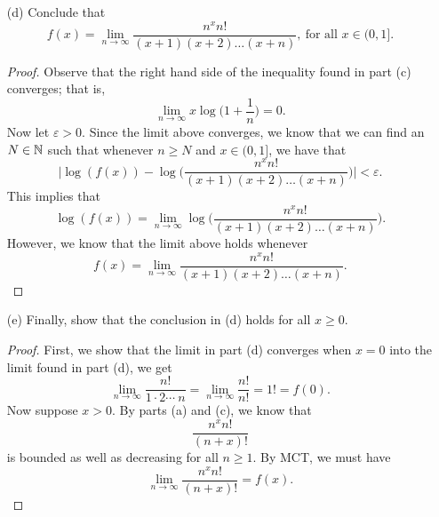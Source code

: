 \begin{enumerate}
\begin{proof}
\begin{align*}
            \end{align*}
            Hence, we have reached our desired result that
            \[  0 \leq \log(f(x)) - \log \Big( \frac{ n^{x} n!  }{ (x+1)(x+2) \dotsb (x+n)  }  \Big) \leq x \log \Big( 1 + \frac{ 1 }{ n }  \Big). \]
            \end{proof}
        \item[(d)] Conclude that 
            \[  f(x) = \lim_{ n \to \infty  }  \frac{ n^{x} n!  }{ (x+1)(x+2) \dots (x+n)  }, \ \text{for all } x \in (0,1]. \]
            \begin{proof}
                Observe that the right hand side of the inequality found in part (c) converges; that is, 
                \[  \lim_{ n \to \infty  }  x \log \Big( 1 + \frac{ 1 }{ n }  \Big) = 0.\] Now let \( \varepsilon > 0  \). Since the limit above converges, we know that we can find an \( N \in \mathbb{N}  \) such that whenever \( n \geq N  \) and \( x \in (0,1] \), we have that 
                \[  \Bigg| \log(f(x)) - \log \Big( \frac{ n^{x} n!  }{ (x+1)(x+2) \dots (x+n)  }  \Big) \Bigg| < \varepsilon.  \]
                This implies that 
                \[  \log(f(x)) = \lim_{ n \to \infty  }  \log \Big( \frac{ n^{x} n!  }{ (x+1) (x+2) \dots (x+n)  }  \Big). \]
                However, we know that the limit above holds whenever 
                \[  f(x) = \lim_{ n \to \infty  } \frac{ n^{x} n!  }{ (x+1)(x+2) \dots (x+n)  }.   \]
            \end{proof}
        \item[(e)] Finally, show that the conclusion in (d) holds for all \(  x \geq 0  \).
            \begin{proof}
            First, we show that the limit in part (d) converges when \( x = 0  \) into the limit found in part (d), we get 
            \[  \lim_{ n \to \infty  }  \frac{ n!  }{ 1 \cdot 2  \dotsb \  n } = \lim_{ n \to \infty  }  \frac{ n!  }{ n!  } = 1! = f(0)  .  \]
            Now suppose \( x > 0  \). By parts (a) and (c), we know that 
            \[  \frac{ n^{x} n!  }{ (n+x)! }  \] is bounded as well as decreasing for all \( n \geq 1  \). By MCT, we must have
            \[  \lim_{ n \to \infty  }  \frac{ n^{x} n!  }{ (n+x)! } = f(x). \]
            \end{proof}
\end{enumerate} 


